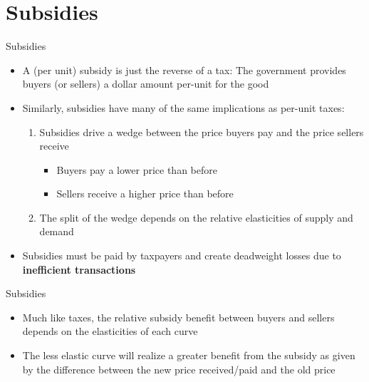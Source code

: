 \documentclass[xcolor={dvipsnames},pdf, hyperref={colorlinks=true, citecolor=ForestGreen, linkcolor=BlueViolet, urlcolor=Magenta}]{beamer}
\begin{document}
\section{Subsidies}

\begin{frame}{Subsidies}
	\begin{itemize}
		\item A (per unit) subsidy is just the reverse of a tax: The government provides buyers (or sellers) a dollar amount per-unit for the good 
		\item Similarly, subsidies have many of the same implications as per-unit taxes:
		\begin{enumerate}
			\item Subsidies drive a wedge between the price buyers pay and the price sellers receive
			\begin{itemize}
				\item Buyers pay a lower price than before
				\item Sellers receive a higher price than before
			\end{itemize}
			\item The split of the wedge depends on the relative elasticities of supply and demand
		\end{enumerate}
		\item Subsidies must be paid by taxpayers and create deadweight losses due to \textbf{inefficient transactions}
	\end{itemize}
	
\end{frame}



\begin{frame}{Subsidies}
	\begin{itemize}
		\item Much like taxes, the relative subsidy benefit between buyers and sellers depends on the elasticities of each curve
		\item The less elastic curve will realize a greater benefit from the subsidy as given by the difference between the new price received/paid and the old price
	\end{itemize}
\end{frame}
\end{document}
